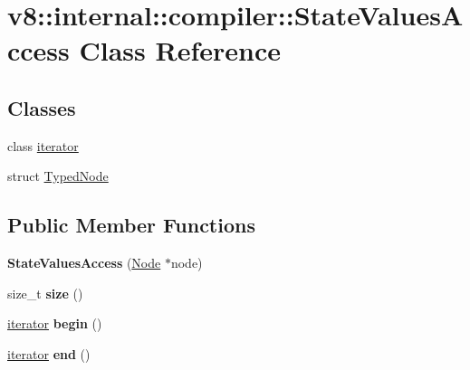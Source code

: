 \hypertarget{classv8_1_1internal_1_1compiler_1_1_state_values_access}{}\section{v8\+:\+:internal\+:\+:compiler\+:\+:State\+Values\+Access Class Reference}
\label{classv8_1_1internal_1_1compiler_1_1_state_values_access}
\subsection*{Classes}
\begin{DoxyCompactItemize}
\item 
class \hyperlink{classv8_1_1internal_1_1compiler_1_1_state_values_access_1_1iterator}{iterator}
\item 
struct \hyperlink{structv8_1_1internal_1_1compiler_1_1_state_values_access_1_1_typed_node}{Typed\+Node}
\end{DoxyCompactItemize}
\subsection*{Public Member Functions}
\begin{DoxyCompactItemize}
\item 
{\bfseries State\+Values\+Access} (\hyperlink{classv8_1_1internal_1_1compiler_1_1_node}{Node} $\ast$node)\hypertarget{classv8_1_1internal_1_1compiler_1_1_state_values_access_ac9211a9bf437f0036f0ffcd6797f0022}{}\label{classv8_1_1internal_1_1compiler_1_1_state_values_access_ac9211a9bf437f0036f0ffcd6797f0022}

\item 
size\+\_\+t {\bfseries size} ()\hypertarget{classv8_1_1internal_1_1compiler_1_1_state_values_access_a9937af0d37330637cfb4db7e96b511a0}{}\label{classv8_1_1internal_1_1compiler_1_1_state_values_access_a9937af0d37330637cfb4db7e96b511a0}

\item 
\hyperlink{classv8_1_1internal_1_1compiler_1_1_state_values_access_1_1iterator}{iterator} {\bfseries begin} ()\hypertarget{classv8_1_1internal_1_1compiler_1_1_state_values_access_adf076c418f6388c34fb3b459a9e30de5}{}\label{classv8_1_1internal_1_1compiler_1_1_state_values_access_adf076c418f6388c34fb3b459a9e30de5}

\item 
\hyperlink{classv8_1_1internal_1_1compiler_1_1_state_values_access_1_1iterator}{iterator} {\bfseries end} ()\hypertarget{classv8_1_1internal_1_1compiler_1_1_state_values_access_a3813a379f5e0c2bddc8a3501772c379e}{}\label{classv8_1_1internal_1_1compiler_1_1_state_values_access_a3813a379f5e0c2bddc8a3501772c379e}

\end{DoxyCompactItemize}
